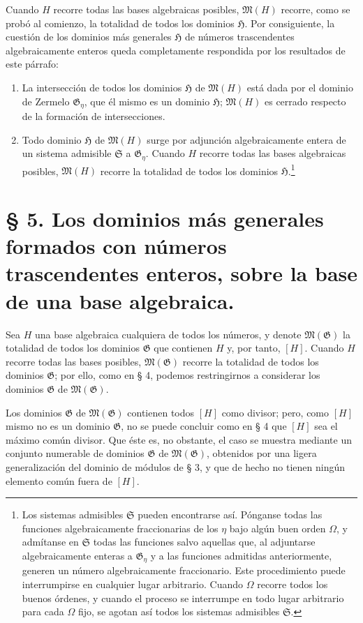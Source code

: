 \documentclass[11pt]{article}
\begin{document}
Cuando $H$ recorre todas las bases algebraicas posibles, $\mathfrak M(H)$ recorre, como se probó al comienzo, la totalidad de todos los dominios $\mathfrak H$. Por consiguiente, la cuestión de los dominios más generales $\mathfrak H$ de números trascendentes algebraicamente enteros queda completamente respondida por los resultados de este párrafo:
\begin{enumerate}
\item[a)] La intersección de todos los dominios $\mathfrak H$ de $\mathfrak M(H)$ está dada por el dominio de Zermelo $\mathfrak G_\eta$, que él mismo es un dominio $\mathfrak H$; $\mathfrak M(H)$ es cerrado respecto de la formación de intersecciones.
\item[b)] Todo dominio $\mathfrak H$ de $\mathfrak M(H)$ surge por adjunción algebraicamente entera de un sistema admisible $\mathfrak S$ a $\mathfrak G_\eta$. Cuando $H$ recorre todas las bases algebraicas posibles, $\mathfrak M(H)$ recorre la totalidad de todos los dominios $\mathfrak H$.\footnote{Los sistemas admisibles $\mathfrak S$ pueden encontrarse así. Pónganse todas las funciones algebraicamente fraccionarias de los $\eta$ bajo algún buen orden $\Omega$, y admítanse en $\mathfrak S$ todas las funciones salvo aquellas que, al adjuntarse algebraicamente enteras a $\mathfrak G_\eta$ y a las funciones admitidas anteriormente, generen un número algebraicamente fraccionario. Este procedimiento puede interrumpirse en cualquier lugar arbitrario. Cuando $\Omega$ recorre todos los buenos órdenes, y cuando el proceso se interrumpe en todo lugar arbitrario para cada $\Omega$ fijo, se agotan así todos los sistemas admisibles $\mathfrak S$.}
\end{enumerate}

\section*{§ 5. Los dominios más generales formados con números trascendentes enteros, sobre la base de una base algebraica.}

Sea $H$ una base algebraica cualquiera de todos los números, y denote $\mathfrak M(\mathfrak G)$ la totalidad de todos los dominios $\mathfrak G$ que contienen $H$ y, por tanto, $[H]$. Cuando $H$ recorre todas las bases posibles, $\mathfrak M(\mathfrak G)$ recorre la totalidad de todos los dominios $\mathfrak G$; por ello, como en § 4, podemos restringirnos a considerar los dominios $\mathfrak G$ de $\mathfrak M(\mathfrak G)$.

Los dominios $\mathfrak G$ de $\mathfrak M(\mathfrak G)$ contienen todos $[H]$ como divisor; pero, como $[H]$ mismo no es un dominio $\mathfrak G$, no se puede concluir como en § 4 que $[H]$ sea el máximo común divisor. Que éste es, no obstante, el caso se muestra mediante un conjunto numerable de dominios $\mathfrak G$ de $\mathfrak M(\mathfrak G)$, obtenidos por una ligera generalización del dominio de módulos de § 3, y que de hecho no tienen ningún elemento común fuera de $[H]$.
\end{document}
